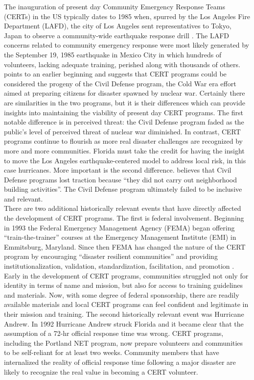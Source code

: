 \documentclass[11pt,fleqn]{book} %
\begin{document}
The inauguration of present day Community Emergency Response Teams (CERTs) in the US typically dates to 1985 when, spurred by the Los Angeles Fire Department (LAFD), the city of Los Angeles sent representatives to Tokyo, Japan to observe a community-wide earthquake response drill \autocite{simpson_community_2001}. The LAFD concerns related to community emergency response were most likely generated by the September 19, 1985 earthquake in Mexico City in which hundreds of volunteers, lacking adequate training, perished along with thousands of others. \textcite{simpson_community_2001} points to an earlier beginning and suggests that CERT programs could be considered the progeny of the Civil Defense program, the Cold War era effort aimed at preparing citizens for disaster spawned by nuclear war. Certainly there are similarities in the two programs, but it is their differences which can provide insights into maintaining the viability of present day CERT programs. The first notable difference is in perceived threat: the Civil Defense program faded as the public's level of perceived threat of nuclear war diminished. In contrast, CERT programs continue to flourish as more real disaster challenges are recognized by more and more communities. Florida must take the credit for having the insight to move the Los Angeles earthquake-centered model to address local risk, in this case hurricanes. More important is the second difference. \textcite{simpson_community_2001} believes that Civil Defense programs lost traction because \enquote{they did not carry out neighborhood building activities}. The Civil Defense program ultimately failed to be inclusive and relevant.\\

\noindent There are two additional historically relevant events that have directly affected the development of CERT programs. The first is federal involvement. Beginning in 1993 the Federal Emergency Management Agency (FEMA) began offering \enquote{train-the-trainer} courses at the Emergency Management Institute (EMI) in Emmitsburg, Maryland. Since then FEMA has changed the nature of the CERT program by encouraging \enquote{disaster resilient communities} and providing institutionalization, validation, standardization, facilitation, and promotion \autocite{simpson_community_2001}. Early in the development of CERT programs, communities struggled not only for identity in terms of name and mission, but also for access to training guidelines and materials. Now, with some degree of federal sponsorship, there are readily available materials and local CERT programs can feel confident and legitimate in their mission and training. The second historically relevant event was Hurricane Andrew. In 1992 Hurricane Andrew struck Florida and it became clear that the assumption of a 72-hr official response time was wrong. CERT programs, including the Portland NET program, now prepare volunteers and communities to be self-reliant for at least two weeks. Community members that have internalized the reality of official response time following a major disaster are likely to recognize the real value in becoming a CERT volunteer.
\end{document}
